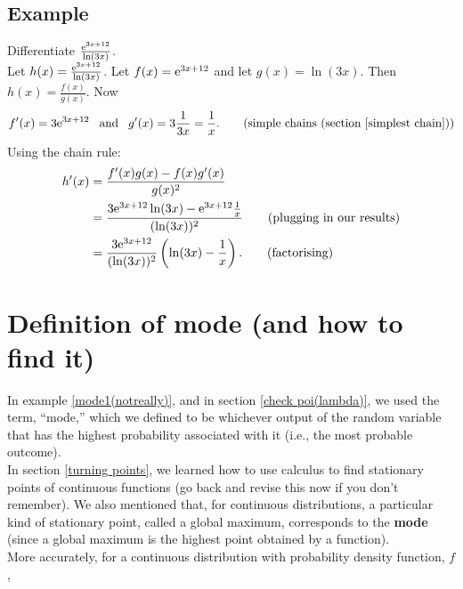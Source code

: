 \subsection{Example}
Differentiate $\frac{\mathrm{e}^{3x+12}}{\ln(3x)}$. \\

\solution
Let $h(x) = \frac{\mathrm{e}^{3x+12}}{\ln(3x)}$. Let $f(x) = \mathrm{e}^{3x+12}$ and let $g(x) = \ln(3x)$. Then $h(x) = \frac{f(x)}{g(x)}$. Now
\[
f'(x) = 3\e^{3x+12} \;\;\; \text{and} \;\;\; g'(x) = 3\frac{1}{3x} = \frac{1}{x}. \tag{simple chains (section \ref{simplest chain})}
\]
Using the chain rule:
\begin{align*}
h'(x) 		& = \frac{f'(x)g(x) - f(x)g'(x)}{g(x)^2} \\
		& = \frac{3\mathrm{e}^{3x+12}\ln(3x) - \mathrm{e}^{3x+12}\frac{1}{x}}{(\ln(3x))^2} \tag{plugging in our results} \\
		& = \frac{3\mathrm{e}^{3x+12}}{(\ln(3x))^2}\left(\ln(3x) - \frac{1}{x}\right). \tag{factorising}
\end{align*}

\section{Definition of mode (and how to find it)} \label{mode definition}
\noindent In example \ref{mode1(notreally)}, and in section \ref{check poi(lambda)}, we used the term, ``mode,'' which we defined to be whichever output of the random variable that has the highest probability associated with it (i.e., the most probable outcome). \\

\noindent In section \ref{turning points}, we learned how to use calculus to find stationary points of continuous functions (go back and revise this now if you don't remember). We also mentioned that,  for continuous distributions, a particular kind of stationary point, called a global maximum, corresponds to the \textbf{mode} (since a global maximum is the highest point obtained by a function). \\


\noindent More accurately, for a continuous distribution with probability density function, $f$,

  	\bigskip
	
	\hfil{}
	\bigskip
	
